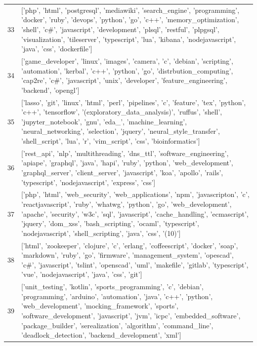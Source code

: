 \begin{center}
\begin{longtable}{|p{1.5cm}|p{12.5cm}|}
            33 & ['php', 'html', 'postgresql', 'mediawiki', 'search\_engine', 'programming', 'docker', 'ruby', 'devops', 'python', 'go', 'c++', 'memory\_optimization', 'shell', 'c\#', 'javascript', 'development', 'plsql', 'restful', 'plpgsql', 'visualization', 'tileserver', 'typescript', 'lua', 'kibana', 'nodejavascript', 'java', 'css', 'dockerfile']  \\ 
            34 & ['game\_developer', 'linux', 'images', 'camera', 'c', 'debian', 'scripting', 'automation', 'kerbal', 'c++', 'python', 'go', 'distrbution\_computing', 'cap2re', 'c\#', 'javascript', 'unix', 'developer', 'feature\_engineering', 'backend', 'opengl']  \\ 
            35 & ['lasso', 'git', 'linux', 'html', 'perl', 'pipelines', 'c', 'feature', 'tex', 'python', 'c++', 'tensorflow', '(exploratory\_data\_analysis)', 'ruffus', 'shell', 'jupyter\_notebook', 'gnu', 'eda\_', 'machine\_learning', 'neural\_networking', 'selection', 'jquery', 'neural\_style\_transfer', 'shell\_script', 'lua', 'r', 'vim\_script', 'css', 'bioinformatics']  \\ 
            36 & ['rest\_api', 'nlp', 'multithreading', 'dns\_ttl', 'software\_engineering', 'apiape', 'graphql', 'java', 'hapi', 'ruby', 'python', 'web\_development', 'graphql\_server', 'client\_server', 'javascript', 'koa', 'apollo', 'rails', 'typescript', 'nodejavascript', 'express', 'css']  \\ 
            37 & ['php', 'html', 'web\_security', 'web\_applications', 'npm', 'javascripton', 'c', 'reactjavascript', 'ruby', 'whatwg', 'python', 'go', 'web\_development', 'apache', 'security', 'w3c', 'sql', 'javascript', 'cache\_handling', 'ecmascript', 'jquery', 'dom\_xss', 'bash\_scripting', 'ocaml', 'typescript', 'nodejavascript', 'shell\_scripting', 'java', 'css', '(10)']  \\ 
            38 & ['html', 'zookeeper', 'clojure', 'c', 'erlang', 'coffeescript', 'docker', 'soap', 'markdown', 'ruby', 'go', 'firmware', 'management\_system', 'opescad', 'c\#', 'javascript', 'tslint', 'openscad', 'uml', 'makefile', 'gitlab', 'typescript', 'vue', 'nodejavascript', 'java', 'css', 'git']  \\ 
            39 & ['unit\_testing', 'kotlin', 'sports\_programming', 'c', 'debian', 'programming', 'arduino', 'automation', 'java', 'c++', 'python', 'web\_development', 'mocking\_framework', 'sports', 'software\_development', 'javascript', 'jvm', 'icpc', 'embedded\_software', 'package\_builder', 'serealization', 'algorithm', 'command\_line', 'deadlock\_detection', 'backend\_development', 'xml']  \\ 

\end{longtable}
\end{center}
